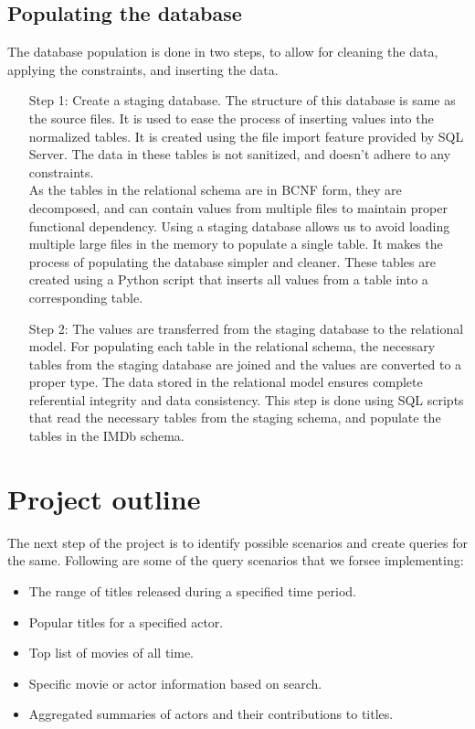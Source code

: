 \documentclass{sig-alternate}
\begin{document}
	\subsection{Populating the database}
        The database population is done in two steps, to allow for cleaning the data, applying the constraints, and inserting the data.
        \begin{enumerate}
                \item[Step 1:] Create a staging database. The structure of this database is same as the source files. It is used to ease the process of inserting values into the normalized tables. It is created using the file import feature provided by SQL Server. The data in these tables is not sanitized, and doesn't adhere to any constraints.\\
As the tables in the relational schema are in BCNF form, they are decomposed, and can contain values from multiple files to maintain proper functional dependency. Using a staging database allows us to avoid loading multiple large files in the memory to populate a single table. It makes the process of populating the database simpler and cleaner. These tables are created using a Python script that inserts all values from a table into a corresponding table.

                \item[Step 2:] The values are transferred from the staging database to the relational model. For populating each table in the relational schema, the necessary tables from the staging database are joined and the values are converted to a proper type. The data stored in the relational model ensures complete referential integrity and data consistency. This step is done using SQL scripts that read the necessary tables from the staging schema, and populate the tables in the IMDb schema.
        \end{enumerate}
\bigskip
	\section{Project outline}
	The next step of the project is to identify possible scenarios and create queries for the same. Following are some of the query scenarios that we forsee implementing:
        \begin{itemize}
            \item The range of titles released during a specified time period.
            \item Popular titles for a specified actor.
            \item Top list of movies of all time.
            \item Specific movie or actor information based on search.
           \item Aggregated summaries of actors and their contributions to titles.
        \end{itemize}
\end{document}
